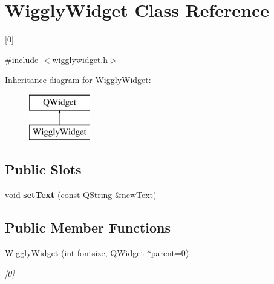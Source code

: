 \hypertarget{class_wiggly_widget}{\section{Wiggly\-Widget Class Reference}
\label{class_wiggly_widget}
}


\mbox{[}0\mbox{]}  




{\ttfamily \#include $<$wigglywidget.\-h$>$}

Inheritance diagram for Wiggly\-Widget\-:\begin{figure}[H]
\begin{center}
\leavevmode
\includegraphics[height=2.000000cm]{class_wiggly_widget}
\end{center}
\end{figure}
\subsection*{Public Slots}
\begin{DoxyCompactItemize}
\item 
\hypertarget{class_wiggly_widget_ad5a15c8f2b92caff1ea0b2332bc33247}{void {\bfseries set\-Text} (const Q\-String \&new\-Text)}\label{class_wiggly_widget_ad5a15c8f2b92caff1ea0b2332bc33247}

\end{DoxyCompactItemize}
\subsection*{Public Member Functions}
\begin{DoxyCompactItemize}
\item 
\hypertarget{class_wiggly_widget_a01692879d180d866e26bc8a7463b5457}{\hyperlink{class_wiggly_widget_a01692879d180d866e26bc8a7463b5457}{Wiggly\-Widget} (int fontsize, Q\-Widget $\ast$parent=0)}\label{class_wiggly_widget_a01692879d180d866e26bc8a7463b5457}

\begin{DoxyCompactList}\small\item\em \mbox{[}0\mbox{]} \end{DoxyCompactList}\end{DoxyCompactItemize}
